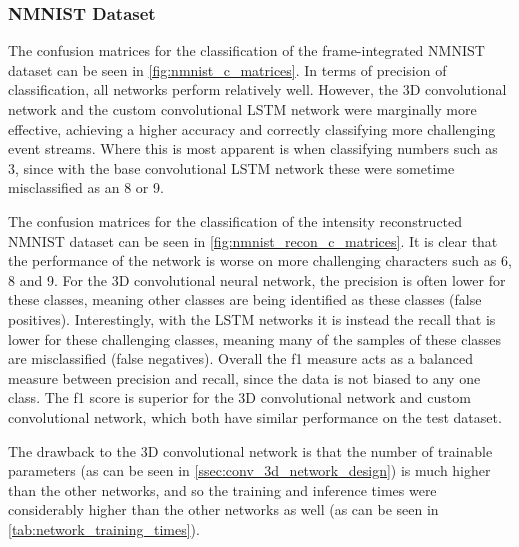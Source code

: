 \subsubsection{NMNIST Dataset}

The confusion matrices for the classification of the frame-integrated  NMNIST dataset can be seen in \cref{fig:nmnist_c_matrices}. In terms of precision of classification, all networks perform relatively well. However, the 3D convolutional network and the custom convolutional LSTM network were marginally more effective, achieving a higher accuracy and correctly classifying more challenging event streams. Where this is most apparent is when classifying numbers such as 3, since with the base convolutional LSTM network these were sometime misclassified as an 8 or 9.

The confusion matrices for the classification of the intensity reconstructed NMNIST dataset can be seen in \cref{fig:nmnist_recon_c_matrices}. It is clear that the performance of the network is worse on more challenging characters such as 6, 8 and 9. For the 3D convolutional neural network, the precision is often lower for these classes, meaning other classes are being identified as these classes (false positives). Interestingly, with the LSTM networks it is instead the recall that is lower for these challenging classes, meaning many of the samples of these classes are misclassified (false negatives). Overall the f1 measure acts as a balanced measure between precision and recall, since the data is not biased to any one class. The f1 score is superior for the 3D convolutional network and custom convolutional network, which both have similar performance on the test dataset.

The drawback to the 3D convolutional network is that the number of trainable parameters (as can be seen in \cref{ssec:conv_3d_network_design}) is much higher than the other networks, and so the training and inference times were considerably higher than the other networks as well (as can be seen in \cref{tab:network_training_times}).


